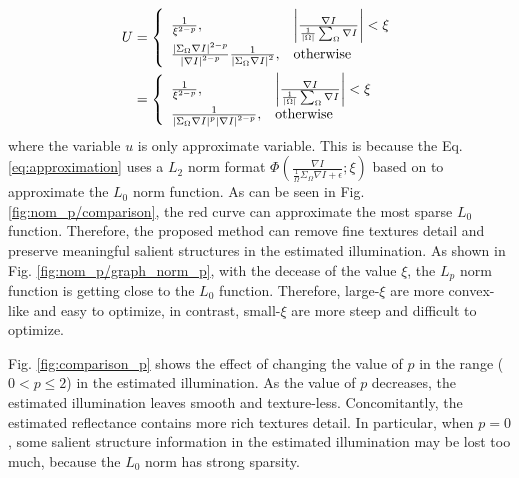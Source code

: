 \begin{align}
U &= \left \{
	\begin{array}{ll}
	\frac{1}{\xi^{2-p}}, 
	& \left |\frac{\nabla{I}}{\frac{1}{|\Omega|} \sum_{\Omega} \nabla{I} } \right| < \xi\\
	\frac{\left |\Sigma_{\Omega} \nabla{I} \right|^{2-p}}{\left |\nabla{I} \right|^{2-p}} \frac{1}{\left |\Sigma_{\Omega} \nabla{I} \right|^{2}},
	& \rm{otherwise}
	\end{array}
\right.\\
  &= \left \{
  	\begin{array}{ll}
  	\frac{1}{\xi^{2-p}}, 
  	& \left |\frac{\nabla{I}}{\frac{1}{|\Omega|} \sum_{\Omega} \nabla{I} } \right| < \xi\\
  	\frac{1}{\left |\Sigma_{\Omega} \nabla{I} \right|^{p} \left |\nabla{I} \right|^{2-p}},
  	& \rm{otherwise}
  	\end{array}
\right. \label{eq:lp_shape}
\end{align}
where the variable $u$ is only approximate variable. This is because the Eq. \ref{eq:approximation} uses a $L_{2}$ norm format $\Phi(\frac{\nabla{I}}{\frac{1}{\Omega}\Sigma_{\Omega}\nabla{I}+\epsilon};\xi)$ based on \cite{l0-sparse} to approximate the $L_{0} $ norm function. As can be seen in Fig. \ref{fig:nom_p/comparison}, the red curve can approximate the most sparse $L_{0}$ function. Therefore, the proposed method can remove fine textures detail and preserve meaningful salient structures in the estimated illumination. As shown in Fig. \ref{fig:nom_p/graph_norm_p}, with the decease of the value $\xi$, the $L_{p}$ norm function is getting close to the $L_{0}$ function. Therefore, large-$\xi$ are more convex-like and easy to optimize, in contrast, small-$\xi$ are more steep and difficult to optimize.\par
Fig. \ref{fig:comparison_p} shows the effect of changing the value of $p$ in the range ($0 < p \leq 2$) in the estimated illumination. As the value of $p$ decreases, the estimated illumination leaves smooth and texture-less. Concomitantly, the estimated reflectance contains more rich textures detail. In particular, when $p=0$, some salient structure information in the estimated illumination may be lost too much, because the $L_{0}$ norm has strong sparsity. 
